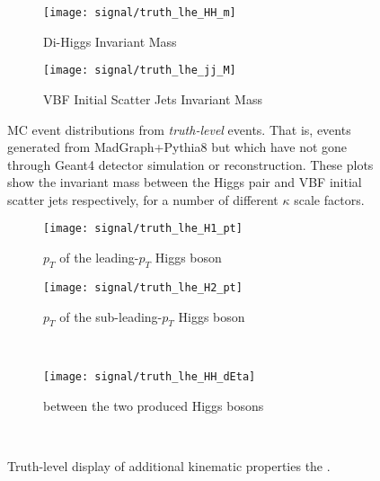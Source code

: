     \begin{figure}[tbh]
        \centering
        \begin{subfigure}{0.48\textwidth}
            \texttt{[image: signal/truth\_lhe\_HH\_m]}
            \captionsetup{justification=centering} \caption{Di-Higgs Invariant Mass}
        \end{subfigure}
        \begin{subfigure}{0.48\textwidth}
            \texttt{[image: signal/truth\_lhe\_jj\_M]}
            \captionsetup{justification=centering} \caption{VBF Initial Scatter Jets Invariant Mass}
        \end{subfigure}
        \caption{
            MC event distributions from \textit{truth-level} events.
            That is, events generated from MadGraph+Pythia8
                but which have not gone through Geant4 detector simulation or reconstruction.
            These plots show the invariant mass between the Higgs pair and VBF initial scatter jets respectively,
                for a number of different $\kappa$ scale factors.
        }
        \label{fig:lhe_truth1}
    \end{figure}

    \begin{figure}[tbh]
        \centering
        \begin{subfigure}{0.48\textwidth}
            \texttt{[image: signal/truth\_lhe\_H1\_pt]}
            \captionsetup{justification=centering} \caption{
                $p_T$ of the leading-$p_T$ Higgs boson
            }
        \end{subfigure}
        \begin{subfigure}{0.48\textwidth}
            \texttt{[image: signal/truth\_lhe\_H2\_pt]}
            \captionsetup{justification=centering} \caption{
                $p_T$ of the sub-leading-$p_T$ Higgs boson
            }
        \end{subfigure} \\

        \begin{subfigure}{0.48\textwidth}
            \texttt{[image: signal/truth\_lhe\_HH\_dEta]}
            \captionsetup{justification=centering} \caption{
                \deta between the two produced Higgs bosons
            }
        \end{subfigure} \\
        \caption{
                Truth-level display of additional kinematic properties the \vbfhhproc.
        }
        \label{fig:lhe_truth2}
    \end{figure}

